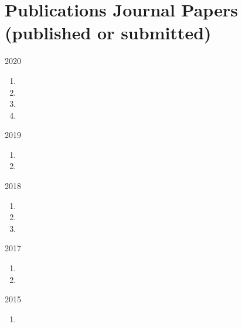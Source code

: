 \section*{Publications {\small Journal Papers (published or submitted)}}

\begin{paracol}{2}
  2020
\switchcolumn
  \begin{enumerate}
    \item {}
    \item {}
    \item {}
    \item {}
    \setcounter{pubcounter}{\theenumi}
  \end{enumerate}
\end{paracol}

\begin{paracol}{2}
  2019
\switchcolumn
  \begin{enumerate}
    \setcounter{enumi}{\thepubcounter}
    \item {}
    \item {}
    \setcounter{pubcounter}{\theenumi}
  \end{enumerate}
\end{paracol}

\begin{paracol}{2}
  2018
\switchcolumn
  \begin{enumerate}
    \setcounter{enumi}{\thepubcounter}
    \item {}
    \item {}
    \item {}
    \setcounter{pubcounter}{\theenumi}
  \end{enumerate}
\end{paracol}

\begin{paracol}{2}
  2017
\switchcolumn
  \begin{enumerate}
    \setcounter{enumi}{\thepubcounter}
    \item {}
    \item {}
    \setcounter{pubcounter}{\theenumi}
  \end{enumerate}
\end{paracol}

\begin{paracol}{2}
  2015
\switchcolumn
  \begin{enumerate}
    \setcounter{enumi}{\thepubcounter}
    \item {}
    \setcounter{pubcounter}{\theenumi}
  \end{enumerate}
\end{paracol}